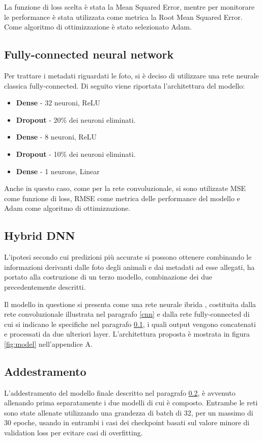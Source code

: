         La funzione di loss scelta è stata la Mean Squared Error, mentre per monitorare le performance è stata utilizzata come metrica la Root Mean Squared Error. Come algoritmo di ottimizzazione è stato selezionato Adam.

    \subsection{Fully-connected neural network}
    \label{mlp}
    Per trattare i metadati riguardati le foto, si è deciso di utilizzare una rete neurale classica fully-connected. Di seguito viene 
    riportata l'architettura del modello:
    \begin{itemize}
        \item \textbf{Dense} - 32 neuroni, ReLU
        \item \textbf{Dropout} - 20\% dei neuroni eliminati.
        \item \textbf{Dense} - 8 neuroni, ReLU
        \item \textbf{Dropout} - 10\% dei neuroni eliminati.
        \item \textbf{Dense} - 1 neurone, Linear
    \end{itemize}

    Anche in questo caso, come per la rete convoluzionale, si sono utilizzate MSE come funzione di loss, RMSE come metrica delle performance del modello e Adam come algoritmo di ottimizzazione.

    \subsection{Hybrid DNN}
    \label{mulinput}
    L'ipotesi secondo cui predizioni più accurate si possono ottenere combinando le informazioni derivanti dalle foto degli animali e dai metadati ad esse allegati, ha portato alla
    costruzione di un terzo modello, combinazione dei due precedentemente descritti.

    Il modello in questione si presenta come una rete neurale ibrida \cite{yuan2020hybriddnns}, costituita dalla rete convoluzionale illustrata nel paragrafo \ref{cnn} e dalla rete fully-connected di cui si indicano le specifiche nel paragrafo \ref{mlp}, i quali output vengono concatenati e processati da due ulteriori layer.
    L'architettura proposta è mostrata in figura \ref{fig:model} nell'appendice A.


    \subsection{Addestramento}
    L'addestramento del modello finale descritto nel paragrafo \ref{mulinput}, è avvenuto allenando prima separatamente i due modelli di cui è composto. Entrambe le reti sono state allenate utilizzando una grandezza di batch di 32, per un massimo di 30 epoche, usando in entrambi i casi dei checkpoint basati sul valore minore di validation loss per evitare casi di overfitting. 

